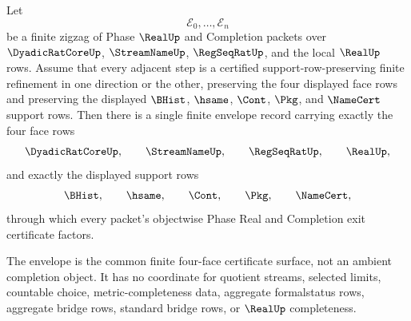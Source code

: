 \begin{theorem}
\label{thm:real-l10-exit-refinement-common-envelope}
Let
$$
\mathcal E_0,\ldots,\mathcal E_n
$$
be a finite zigzag of Phase $\RealUp$ and Completion packets over $\DyadicRatCoreUp$, $\StreamNameUp$, $\RegSeqRatUp$, and the local $\RealUp$ rows. Assume that every adjacent step is a certified support-row-preserving finite refinement in one direction or the other, preserving the four displayed face rows and preserving the displayed $\BHist$, $\hsame$, $\Cont$, $\Pkg$, and $\NameCert$ support rows. Then there is a single finite envelope record carrying exactly the four face rows
$$
\DyadicRatCoreUp,\qquad \StreamNameUp,\qquad \RegSeqRatUp,\qquad \RealUp,
$$
and exactly the displayed support rows
$$
\BHist,\qquad \hsame,\qquad \Cont,\qquad \Pkg,\qquad \NameCert,
$$
through which every packet's objectwise Phase Real and Completion exit certificate factors.

The envelope is the common finite four-face certificate surface, not an ambient completion object. It has no coordinate for quotient streams, selected limits, countable choice, metric-completeness data, aggregate formalstatus rows, aggregate bridge rows, standard bridge rows, or $\RealUp$ completeness.
\end{theorem}
